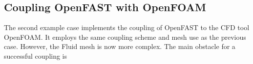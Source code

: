 \subsection{Coupling OpenFAST with OpenFOAM}

The second example case implements the coupling of OpenFAST to the CFD tool OpenFOAM. It employs the same coupling scheme and mesh use as the previous case. However, the Fluid mesh is now more complex. The main obstacle for a successful coupling is 

